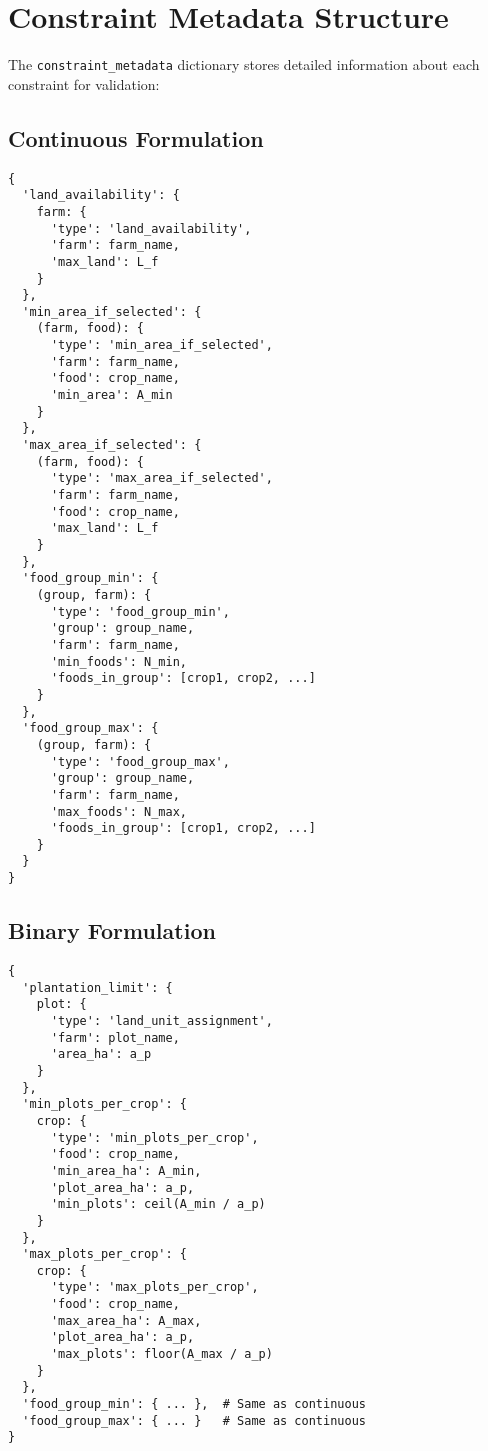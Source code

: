 \documentclass{article}
\begin{document}
\section{Constraint Metadata Structure}

The \texttt{constraint\_metadata} dictionary stores detailed information about each constraint for validation:

\subsection{Continuous Formulation}

\begin{verbatim}
{
  'land_availability': {
    farm: {
      'type': 'land_availability',
      'farm': farm_name,
      'max_land': L_f
    }
  },
  'min_area_if_selected': {
    (farm, food): {
      'type': 'min_area_if_selected',
      'farm': farm_name,
      'food': crop_name,
      'min_area': A_min
    }
  },
  'max_area_if_selected': {
    (farm, food): {
      'type': 'max_area_if_selected',
      'farm': farm_name,
      'food': crop_name,
      'max_land': L_f
    }
  },
  'food_group_min': {
    (group, farm): {
      'type': 'food_group_min',
      'group': group_name,
      'farm': farm_name,
      'min_foods': N_min,
      'foods_in_group': [crop1, crop2, ...]
    }
  },
  'food_group_max': {
    (group, farm): {
      'type': 'food_group_max',
      'group': group_name,
      'farm': farm_name,
      'max_foods': N_max,
      'foods_in_group': [crop1, crop2, ...]
    }
  }
}
\end{verbatim}

\subsection{Binary Formulation}

\begin{verbatim}
{
  'plantation_limit': {
    plot: {
      'type': 'land_unit_assignment',
      'farm': plot_name,
      'area_ha': a_p
    }
  },
  'min_plots_per_crop': {
    crop: {
      'type': 'min_plots_per_crop',
      'food': crop_name,
      'min_area_ha': A_min,
      'plot_area_ha': a_p,
      'min_plots': ceil(A_min / a_p)
    }
  },
  'max_plots_per_crop': {
    crop: {
      'type': 'max_plots_per_crop',
      'food': crop_name,
      'max_area_ha': A_max,
      'plot_area_ha': a_p,
      'max_plots': floor(A_max / a_p)
    }
  },
  'food_group_min': { ... },  # Same as continuous
  'food_group_max': { ... }   # Same as continuous
}
\end{verbatim}
\end{document}
